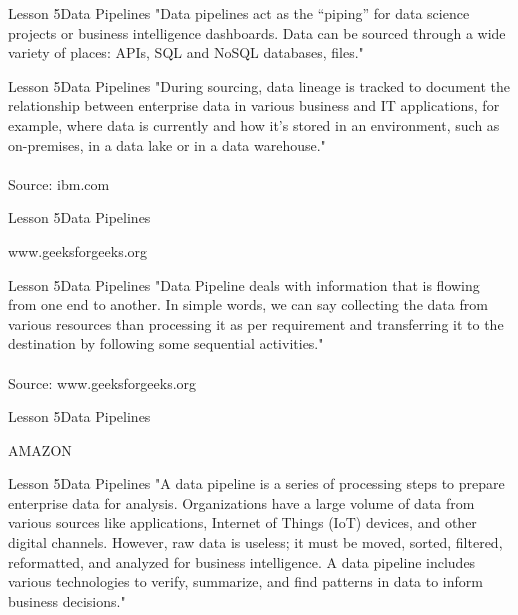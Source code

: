\documentclass[aspectratio=1610]{beamer}
\begin{document}
\begin{frame}{Lesson 5}{Data Pipelines}
\LARGE
"Data pipelines act as the “piping” for data science projects or 
business intelligence dashboards. Data can be sourced through a wide 
variety of places: APIs, SQL and NoSQL databases, files."
\end{frame}

\begin{frame}{Lesson 5}{Data Pipelines}
\LARGE
"During sourcing, data lineage is tracked to document the 
relationship between enterprise data in various business and IT 
applications, for example, where data is currently and how it’s 
stored in an environment, such as on-premises, in a data lake or in a
data warehouse."\\~\\
Source: ibm.com
\end{frame}

\begin{frame}{Lesson 5}{Data Pipelines}
\Huge
\begin{center}
www.geeksforgeeks.org
\end{center}
\end{frame}


\begin{frame}{Lesson 5}{Data Pipelines}
\LARGE
"Data Pipeline deals with information that is flowing from one end to 
another. In simple words, we can say collecting the data from various 
resources than processing it as per requirement and transferring it 
to the destination by following some sequential activities."\\~\\
Source: www.geeksforgeeks.org
\end{frame}

\begin{frame}
\end{frame}


\begin{frame}{Lesson 5}{Data Pipelines}
\Huge
\begin{center}
AMAZON
\end{center}
\end{frame}


\begin{frame}{Lesson 5}{Data Pipelines}
\LARGE
"A data pipeline is a series of processing steps to prepare 
enterprise data for analysis. Organizations have a large volume of 
data from various sources like applications, Internet of Things (IoT)
devices, and other digital channels. However, raw data is useless; it
must be moved, sorted, filtered, reformatted, and analyzed for
business intelligence. A data pipeline includes various technologies
to verify, summarize, and find patterns in data to inform business 
decisions."
\end{frame}
\end{document}
